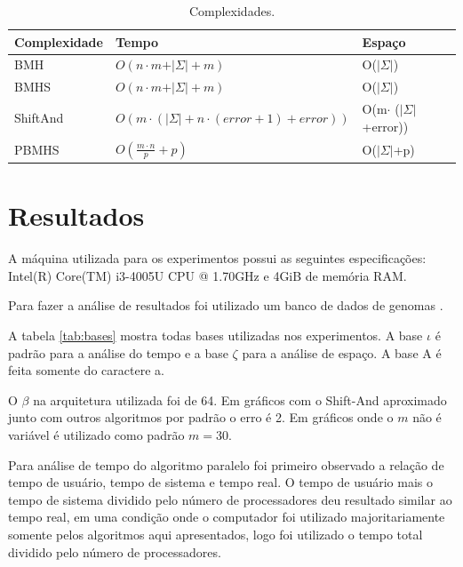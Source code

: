 \documentclass[11pt]{article}
\begin{document}
\begin{table}[htbp]
\centering
\begin{tabular}{lll}
\hline
Complexidade & Tempo & Espaço\\
\hline
BMH & \(O(n\cdot m+\vert\Sigma\vert+m)\) & O(\(\vert{} \Sigma \vert{}\))\\
BMHS & \(O(n\cdot m+\vert\Sigma\vert+m)\) & O(\(\vert{} \Sigma \vert{}\))\\
ShiftAnd & \(O(m\cdot (\vert\Sigma\vert+ n\cdot (error+1)+error))\) & O(m\(\cdot\) (\(\vert{} \Sigma \vert{}\)+error))\\
PBMHS & \(O(\frac{m\cdot n}{p}+p)\) & O(\(\vert{} \Sigma \vert{}\)+p)\\
\hline
\end{tabular}
\caption{\label{tab:complexidade}
Complexidades.}

\end{table}

\section{Resultados}
\label{sec:org4a12241}
A máquina utilizada para os experimentos possui as seguintes especificações: Intel(R) Core(TM) i3-4005U CPU @ 1.70GHz e 4GiB de memória RAM.

Para fazer a análise de resultados foi utilizado um banco de dados de genomas \cite{genomelist}.

A tabela \ref{tab:bases} mostra todas bases utilizadas nos experimentos. A base \(\iota\) é padrão para a análise do tempo e a base \(\zeta\) para a análise de espaço. A base A é feita somente do caractere a.

O \(\beta\) na arquitetura utilizada foi de 64. Em gráficos com o Shift-And aproximado junto com outros algoritmos por padrão o erro é 2. Em gráficos onde o \(m\) não é variável é utilizado como padrão \(m=30\).

Para análise de tempo do algoritmo paralelo foi primeiro observado a relação de tempo de usuário, tempo de sistema e tempo real. O tempo de usuário mais o tempo de sistema dividido pelo número de processadores deu resultado similar ao tempo real, em uma condição onde o computador foi utilizado majoritariamente somente pelos algoritmos aqui apresentados, logo foi utilizado o tempo total dividido pelo número de processadores.
\end{document}
